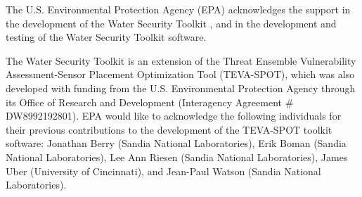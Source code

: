 The U.S. Environmental Protection Agency (EPA) acknowledges the support in the development of the Water Security Toolkit \docTitle , 
and in the development and testing of the Water Security Toolkit software.

The Water Security Toolkit is an extension of the Threat Ensemble Vulnerability 
Assessment-Sensor Placement Optimization Tool (TEVA-SPOT), which was also developed
with funding from the U.S. Environmental Protection Agency through its Office of 
Research and Development (Interagency Agreement \# DW8992192801). EPA would like to 
acknowledge the following individuals for their previous contributions to the development 
of the TEVA-SPOT toolkit software:
Jonathan Berry (Sandia National Laboratories), Erik Boman (Sandia National Laboratories), 
Lee Ann Riesen (Sandia National Laboratories), James Uber (University of Cincinnati), and 
Jean-Paul Watson (Sandia National Laboratories).


